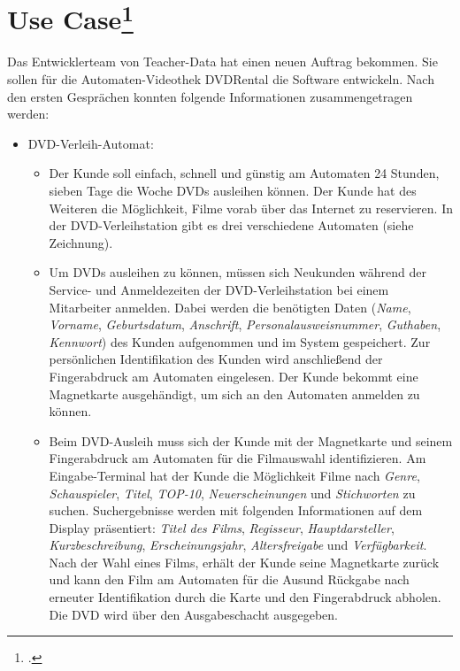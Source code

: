 \documentclass{lehramt-informatik-aufgabe}
\begin{document}

\section{Use Case\footcite{sosy:ab:2}}

Das Entwicklerteam von Teacher-Data hat einen neuen Auftrag bekommen.
Sie sollen für die Automaten-Videothek DVDRental die Software
entwickeln. Nach den ersten Gesprächen konnten folgende Informationen
zusammengetragen werden:

\begin{itemize}
\item DVD-Verleih-Automat:

\begin{itemize}
\item Der Kunde soll einfach, schnell und günstig am Automaten 24
Stunden, sieben Tage die Woche DVDs ausleihen können. Der Kunde hat des
Weiteren die Möglichkeit, Filme vorab über das Internet zu reservieren.
In der DVD-Verleihstation gibt es drei verschiedene Automaten (siehe
Zeichnung).

\item Um DVDs ausleihen zu können, müssen sich Neukunden während der
Service- und Anmeldezeiten der DVD-Verleihstation bei einem Mitarbeiter
anmelden. Dabei werden die benötigten Daten (\emph{Name},
\emph{Vorname}, \emph{Geburtsdatum}, \emph{Anschrift},
\emph{Personalausweisnummer}, \emph{Guthaben}, \emph{Kennwort}) des
Kunden aufgenommen und im System gespeichert. Zur persönlichen
Identifikation des Kunden wird anschließend der Fingerabdruck am
Automaten eingelesen. Der Kunde bekommt eine Magnetkarte ausgehändigt,
um sich an den Automaten anmelden zu können.

\item Beim DVD-Ausleih muss sich der Kunde mit der Magnetkarte und
seinem Fingerabdruck am Automaten für die Filmauswahl identifizieren. Am
Eingabe-Terminal hat der Kunde die Möglichkeit Filme nach \emph{Genre},
\emph{Schauspieler}, \emph{Titel}, \emph{TOP-10},
\emph{Neuerscheinungen} und \emph{Stichworten} zu suchen. Suchergebnisse
werden mit folgenden Informationen auf dem Display präsentiert:
\emph{Titel des Films}, \emph{Regisseur}, \emph{Hauptdarsteller},
\emph{Kurzbeschreibung}, \emph{Erscheinungsjahr}, \emph{Altersfreigabe}
und \emph{Verfügbarkeit}. Nach der Wahl eines Films, erhält der Kunde
seine Magnetkarte zurück und kann den Film am Automaten für die Ausund
Rückgabe nach erneuter Identifikation durch die Karte und den
Fingerabdruck abholen. Die DVD wird über den Ausgabeschacht ausgegeben.


\end{itemize}
\end{itemize}
\end{document}
